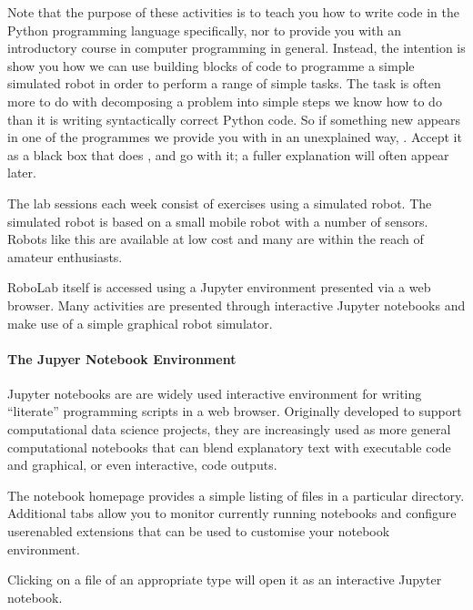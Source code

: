 \documentclass[letterpaper,10pt,english]{sphinxmanual}
\let\sphinxpxdimen\pdfpxdimen\else\newdimen\sphinxpxdimen
\begin{document}
Note that the purpose of these activities is  to teach you how to write code in the Python programming language specifically, nor to provide you with an introductory course in computer programming in general. Instead, the intention is show you how we can use building blocks of code to programme a simple simulated robot in order to perform a range of simple tasks. The  task is often more to do with decomposing a problem into simple steps we know how to do than it is writing
syntactically correct Python code. So if something new appears in one of the programmes we provide you with in an unexplained way, . Accept it as a black box that does , and go with it; a fuller explanation will often appear later.

The lab sessions each week consist of exercises using a simulated robot. The simulated robot is based on a small mobile robot with a number of sensors. Robots like this are available at low cost and many are within the reach of amateur enthusiasts.

RoboLab itself is accessed using a Jupyter environment presented via a web browser. Many activities are presented through interactive Jupyter notebooks and make use of a simple graphical robot simulator.


\paragraph{The Jupyer Notebook Environment}
\label{\detokenize{content/00_SOFTWARE_GUIDE/Section_00_01_Jupyter_environment:The-Jupyer-Notebook-Environment}}
Jupyter notebooks are are widely used interactive environment for writing “literate” programming scripts in a web browser. Originally developed to support computational data science projects, they are increasingly used as more general computational notebooks that can blend explanatory text with executable code and graphical, or even interactive, code outputs.

The notebook homepage provides a simple listing of files in a particular directory. Additional tabs allow you to monitor currently running notebooks and configure user\sphinxhyphen{}enabled extensions that can be used to customise your notebook environment.

\sphinxincludegraphics[width=2160\sphinxpxdimen,height=564\sphinxpxdimen]{{00_01_jupyter_nb_homepage}.png}

Clicking on a file of an appropriate type will open it as an interactive Jupyter notebook.
\end{document}

